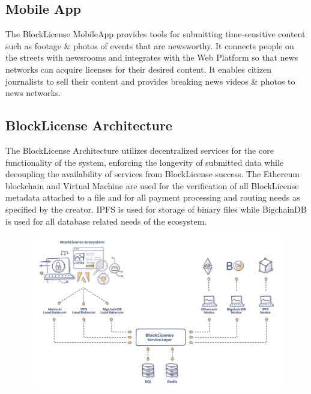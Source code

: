 \subsection{Mobile App}

The BlockLicense MobileApp provides tools for submitting time-sensitive content such as footage \& photos of events that are newsworthy. It connects people on the streets with newsrooms and integrates with the Web Platform so that news networks can acquire licenses for their desired content. It enables citizen journalists to sell their content and provides breaking news videos \& photos to news networks.


\subsection{BlockLicense Architecture}

The BlockLicense Architecture utilizes decentralized services for the core functionality of the system, enforcing the longevity of submitted data while decoupling the availability of services from BlockLicense success. The Ethereum blockchain and Virtual Machine are used for the verification of all BlockLicense metadata attached to a file and for all payment processing and routing needs as specified by the creator. IPFS \cite{ipfs} is used for storage of binary files while BigchainDB \cite{bigchaindb} is used for all database related needs of the ecosystem.

\begin{figure}[!htbp]
\centering
\begin{minipage}{1\textwidth}
  \centering
  \includegraphics[width=1\linewidth]{./figures/fig7.png}
  \label{fig:system}
\end{minipage}%
\end{figure}
